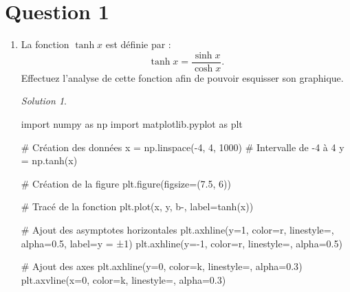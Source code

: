 \documentclass[
  12pt,
  letterpaper,
]{book}
\newenvironment{Shaded}{}{}
\newcommand{\CommentTok}[1]{\textcolor[rgb]{0.42,0.45,0.49}{#1}}
\newcommand{\DecValTok}[1]{\textcolor[rgb]{0.00,0.36,0.77}{#1}}
\newcommand{\FloatTok}[1]{\textcolor[rgb]{0.00,0.36,0.77}{#1}}
\newcommand{\ImportTok}[1]{\textcolor[rgb]{0.01,0.18,0.38}{#1}}
\newcommand{\NormalTok}[1]{\textcolor[rgb]{0.14,0.16,0.18}{#1}}
\newcommand{\OperatorTok}[1]{\textcolor[rgb]{0.14,0.16,0.18}{#1}}
\newcommand{\StringTok}[1]{\textcolor[rgb]{0.01,0.18,0.38}{#1}}
\theoremstyle{remark}
\newtheorem*{solution}{Solution}
\begin{document}
\hypertarget{question-1-3}{%
\section{Question 1}\label{question-1-3}}

\begin{enumerate}
\item
  La fonction \(\tanh x\) est définie par :
  \[\tanh x = \frac{\sinh x}{\cosh x}.\] Effectuez l'analyse de cette
  fonction afin de pouvoir esquisser son graphique.

  \begin{solution}

\begin{Shaded}
\begin{Highlighting}[]
\ImportTok{import}\NormalTok{ numpy }\ImportTok{as}\NormalTok{ np}
\ImportTok{import}\NormalTok{ matplotlib.pyplot }\ImportTok{as}\NormalTok{ plt}

\CommentTok{\# Création des données}
\NormalTok{x }\OperatorTok{=}\NormalTok{ np.linspace(}\OperatorTok{{-}}\DecValTok{4}\NormalTok{, }\DecValTok{4}\NormalTok{, }\DecValTok{1000}\NormalTok{)  }\CommentTok{\# Intervalle de {-}4 à 4}
\NormalTok{y }\OperatorTok{=}\NormalTok{ np.tanh(x)}

\CommentTok{\# Création de la figure}
\NormalTok{plt.figure(figsize}\OperatorTok{=}\NormalTok{(}\FloatTok{7.5}\NormalTok{, }\DecValTok{6}\NormalTok{))}

\CommentTok{\# Tracé de la fonction}
\NormalTok{plt.plot(x, y, }\StringTok{\textquotesingle{}b{-}\textquotesingle{}}\NormalTok{, label}\OperatorTok{=}\StringTok{\textquotesingle{}tanh(x)\textquotesingle{}}\NormalTok{)}

\CommentTok{\# Ajout des asymptotes horizontales}
\NormalTok{plt.axhline(y}\OperatorTok{=}\DecValTok{1}\NormalTok{, color}\OperatorTok{=}\StringTok{\textquotesingle{}r\textquotesingle{}}\NormalTok{, linestyle}\OperatorTok{=}\StringTok{\textquotesingle{}{-}{-}\textquotesingle{}}\NormalTok{, alpha}\OperatorTok{=}\FloatTok{0.5}\NormalTok{, label}\OperatorTok{=}\StringTok{\textquotesingle{}y = ±1\textquotesingle{}}\NormalTok{)}
\NormalTok{plt.axhline(y}\OperatorTok{={-}}\DecValTok{1}\NormalTok{, color}\OperatorTok{=}\StringTok{\textquotesingle{}r\textquotesingle{}}\NormalTok{, linestyle}\OperatorTok{=}\StringTok{\textquotesingle{}{-}{-}\textquotesingle{}}\NormalTok{, alpha}\OperatorTok{=}\FloatTok{0.5}\NormalTok{)}

\CommentTok{\# Ajout des axes}
\NormalTok{plt.axhline(y}\OperatorTok{=}\DecValTok{0}\NormalTok{, color}\OperatorTok{=}\StringTok{\textquotesingle{}k\textquotesingle{}}\NormalTok{, linestyle}\OperatorTok{=}\StringTok{\textquotesingle{}{-}\textquotesingle{}}\NormalTok{, alpha}\OperatorTok{=}\FloatTok{0.3}\NormalTok{)}
\NormalTok{plt.axvline(x}\OperatorTok{=}\DecValTok{0}\NormalTok{, color}\OperatorTok{=}\StringTok{\textquotesingle{}k\textquotesingle{}}\NormalTok{, linestyle}\OperatorTok{=}\StringTok{\textquotesingle{}{-}\textquotesingle{}}\NormalTok{, alpha}\OperatorTok{=}\FloatTok{0.3}\NormalTok{)}


\end{Highlighting}
\end{Shaded}
\end{solution}
\end{enumerate}
\end{document}
